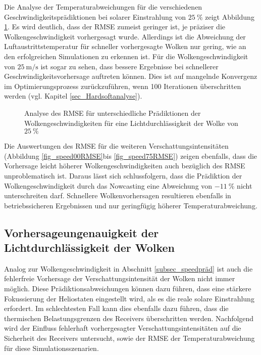 Die Analyse der Temperaturabweichungen für die verschiedenen Geschwindigkeitsprädiktionen bei solarer Einstrahlung von $\SI{25}{\percent}$ zeigt Abbildung \ref{fig_speed25RMSE}.
Es wird deutlich, dass der RMSE zumeist geringer ist, je präziser die Wolkengeschwindigkeit vorhergesagt wurde.
Allerdings ist die Abweichung der Luftaustrittstemperatur für schneller vorhergesagte Wolken nur gering, wie an den erfolgreichen Simulationen zu erkennen ist.
Für die Wolkengeschwindigkeit von $\SI{25}{\metre\per\second}$ ist sogar zu sehen, dass bessere Ergebnisse bei schnellerer Geschwindigkeitsvorhersage auftreten können.
Dies ist auf mangelnde Konvergenz im Optimierungsprozess zurückzuführen, wenn 100 Iterationen überschritten werden (vgl. Kapitel \ref{sec_Hardsoftanalyse}).

\begin{figure}[h!]
    \centering
    \setlength{\fboxsep}{1pt}
    \setlength{\fboxrule}{1pt}
    \caption[Analyse des RMSE für unterschiedliche Prädiktionen der Wolkengeschwindigkeiten für eine Lichtdurchlässigkeit der Wolke von $\SI{25}{\percent}$]{Analyse des RMSE für unterschiedliche Prädiktionen der Wolkengeschwindigkeiten für eine Lichtdurchlässigkeit der Wolke von $\SI{25}{\percent}$}
    \label{fig_speed25RMSE}
\end{figure} \pagebreak

Die Auswertungen des RMSE für die weiteren Verschattungsintensitäten (Abbildung \ref{fig_speed00RMSE}\linebreak bis \ref{fig_speed75RMSE}) zeigen ebenfalls, dass die Vorhersage leicht höherer Wolkengeschwindigkeiten auch bezüglich des RMSE unproblematisch ist.
Daraus lässt sich schlussfolgern, dass die Prädiktion der Wolkengeschwindigkeit durch das Nowcasting eine Abweichung von $\SI{-11}{\percent}$ nicht unterschreiten darf.
Schnellere Wolkenvorhersagen resultieren ebenfalls in betriebssicheren Ergebnissen und nur geringfügig höherer Temperaturabweichung.


\subsection{Vorhersageungenauigkeit der Lichtdurchlässigkeit der Wolken} \label{subsec_shadingpräd}
Analog zur Wolkengeschwindigkeit in Abschnitt \ref{subsec_speedpräd} ist auch die fehlerfreie Vorhersage der Verschattungsintensität der Wolken nicht immer möglich.
Diese Prädiktionsabweichungen können dazu führen, dass eine stärkere Fokussierung der Heliostaten eingestellt wird, als es die reale solare Einstrahlung erfordert.
Im schlechtesten Fall kann dies ebenfalls dazu führen, dass die thermischen Belastungsgrenzen des Receivers überschritten werden.
Nachfolgend wird der Einfluss fehlerhaft vorhergesagter Verschattungsintensitäten auf die Sicherheit des Receivers untersucht, sowie der RMSE der Temperaturabweichung für diese Simulationsszenarien.

